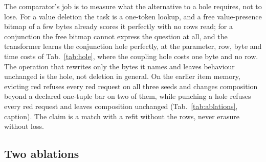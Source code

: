 \documentclass{article} %
\begin{document}
\noindent The comparator's job is to measure what the alternative to a hole requires, not to lose. For a value
deletion the task is a one-token lookup, and a free value-presence bitmap of a few bytes already scores
it perfectly with no rows read; for a conjunction the free bitmap cannot express the question at
all, and the transformer learns the conjunction hole perfectly, at the parameter, row, byte and time
costs of Tab.~\ref{tab:hole}, where the coupling hole costs one
byte and no row. %
\noindent The operation that rewrites only the bytes it names and leaves behaviour unchanged is the
hole, not deletion in general. On the earlier item memory, evicting red refuses every red request on all three
seeds and changes composition beyond a declared one-tuple bar on two of them,
while punching a hole refuses every red request and leaves composition unchanged (Tab.~\ref{tab:ablations}, caption). %
The claim is a match with a refit without the rows, never erasure without loss.

\subsection{Two ablations}
\label{sec:ablations}
\end{document}
